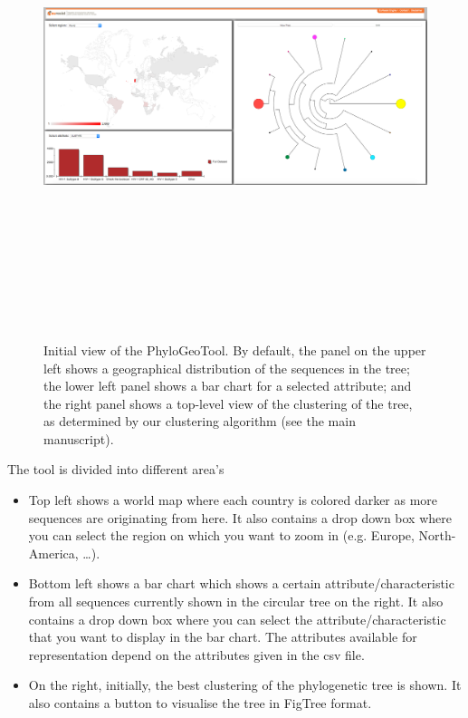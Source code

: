 \documentclass[a4paper, 11pt]{article} %
\begin{document}
\begin{figure}[H]
\centering
\includegraphics[width=400pt, height=400pt, keepaspectratio=true]{images/initial_view.PNG}
\caption{Initial view of the PhyloGeoTool. By default, the panel on the upper left shows a geographical distribution of the sequences in the tree; the lower left panel shows a bar chart for a selected attribute; and the right panel shows a top-level view of the clustering of the tree, as determined by our clustering algorithm (see the main manuscript).}
\label{fig:initial_view}
\end{figure}

The tool is divided into different area's
\begin{itemize}
  \item Top left shows a world map where each country is colored darker as more sequences are originating from here. It also contains a drop down box where you can select the region on which you want to zoom in (e.g. Europe, North-America, \ldots).
  \item Bottom left shows a bar chart which shows a certain attribute/characteristic from all sequences currently shown in the circular tree on the right. It also contains a drop down box where you can select the attribute/characteristic that you want to display in the bar chart. The attributes available for representation depend on the attributes given in the csv file.
  \item On the right, initially, the best clustering of the phylogenetic tree is shown. It also contains a button to visualise the tree in FigTree format.
\end{itemize}
\end{document}
